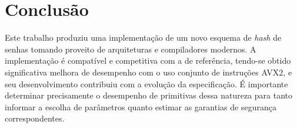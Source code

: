 \documentclass{article}
\begin{document}
\section{Conclusão}

Este trabalho produziu uma implementação de um novo esquema de
\emph{hash} de senhas tomando proveito de arquiteturas e compiladores
modernos. A implementação é compatível e competitiva com a de
referência, tendo-se obtido significativa melhora de desempenho com o
uso conjunto de instruções AVX2, e seu desenvolvimento contribuiu com a
evolução da especificação.
É importante determinar precisamente o desempenho de primitivas dessa natureza para tanto informar a escolha de parâmetros
quanto estimar as garantias de segurança correspondentes.



\end{document}
